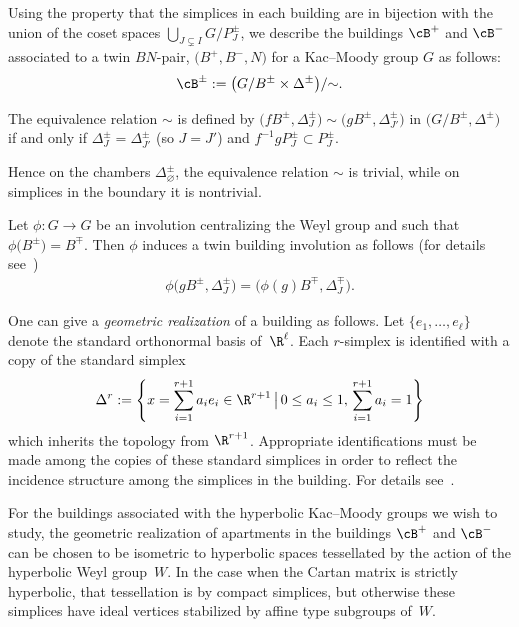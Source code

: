 Using the property that the simplices in each building are in bijection with the union of the coset spaces
$\bigcup_{J\subsetneq I} G/P_{J}^\pm$, we describe the buildings $\cB^+$ and $\cB^-$ associated to a twin $BN$-pair, $\big(B^+, B^-,N\big)$ for a Kac--Moody group $G$ as follows:
\begin{gather}\label{equation:buildingforKacMoodygroup}
\cB^{\pm}:=\big(G/B^{\pm}\times \Delta^\pm\big)/{\sim}.
\end{gather}

The equivalence relation $\sim$ is defined by $\big(fB^{\pm}, \Delta_J^\pm\big) \sim \big(gB^{\pm}, \Delta_{J'}^\pm\big)$ in $\big(G/B^{\pm}, \Delta^\pm\big)$ if and only if $\Delta_J^\pm = \Delta_{J'}^\pm$ (so $J = J'$) and $f^{-1}gP_J^{\pm}\subset P_J^\pm$.

Hence on the chambers $\Delta_{\varnothing}^\pm$, the equivalence relation $\sim$ is trivial, while on simplices in the boundary it is nontrivial.

Let $\phi\colon G\rightarrow G$ be an involution centralizing the Weyl group and such that $\phi\big(B^\pm\big)=B^\mp$. Then $\phi$ induces a twin building involution as follows (for details see~\cite{deMedtsGramlichHorn09, Horn09})
\begin{gather}\label{equation:twin_building_involution}
\phi\big(gB^\pm, \Delta_J^\pm\big)=\big(\phi(g)B^\mp, \Delta_J^\mp\big).
\end{gather}

One can give a {\em geometric realization} of a building as follows. Let $\{e_1,\dots,e_\ell\}$ denote the standard orthonormal basis of~$\R^\ell$. Each $r$-simplex is identified with a copy of the standard simplex
\[\Delta^r := \left\{x = \sum_{i=1}^{r+1} a_i e_i \in \R^{r+1}\, \big|\, 0\leq a_i\leq 1, \, \sum_{i=1}^{r+1} a_i=1 \right\}\]
which inherits the topology from $\R^{r+1}$. Appropriate identifications must be made among the copies of these standard simplices in order to reflect the incidence structure among the simplices in the building. For details see~\cite{AbramenkoBrown08}.

For the buildings associated with the hyperbolic Kac--Moody groups we wish to study, the geometric realization of apartments in the buildings $\cB^+$ and $\cB^-$ can be chosen to be isometric to hyperbolic spaces tessellated by the action of the hyperbolic Weyl group~$W$. In the case when the Cartan matrix is strictly hyperbolic, that tessellation is by compact simplices, but otherwise these simplices have ideal vertices stabilized by affine type subgroups of~$W$.

